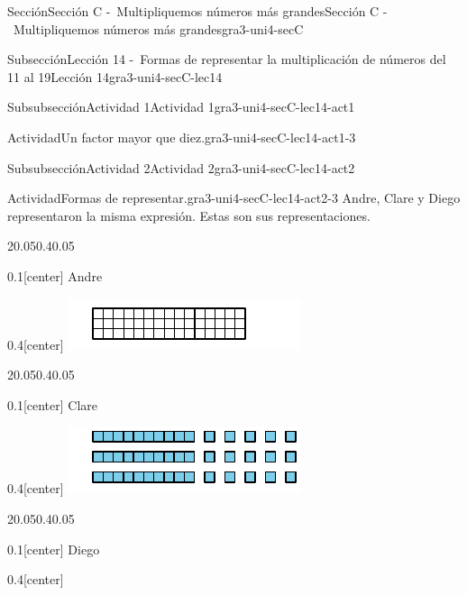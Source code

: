 \documentclass[twoside,10pt,]{article}
\begin{document}
\begin{sectionptx}{Sección}{Sección C -~Multipliquemos números más grandes}{}{Sección C -~Multipliquemos números más grandes}{}{}{gra3-uni4-secC}
\begin{subsectionptx}{Subsección}{Lección 14 -~Formas de representar la multiplicación de números del 11 al 19}{}{Lección 14}{}{}{gra3-uni4-secC-lec14}
\begin{subsubsectionptx}{Subsubsección}{Actividad 1}{}{Actividad 1}{}{}{gra3-uni4-secC-lec14-act1}
\begin{activity}{Actividad}{Un factor mayor que diez.}{gra3-uni4-secC-lec14-act1-3}
\begin{enumerate}
\end{enumerate}
\end{activity}%
\end{subsubsectionptx}
%
%
\typeout{************************************************}
\typeout{************************************************}
%
\begin{subsubsectionptx}{Subsubsección}{Actividad 2}{}{Actividad 2}{}{}{gra3-uni4-secC-lec14-act2}
\begin{activity}{Actividad}{Formas de representar.}{gra3-uni4-secC-lec14-act2-3}%
Andre, Clare y Diego representaron la misma expresión. Estas son sus representaciones.%
\begin{sidebyside}{2}{0.05}{0.4}{0.05}%
\begin{sbspanel}{0.1}[center]%
Andre%
\end{sbspanel}%
\begin{sbspanel}{0.4}[center]%
\includegraphics[width=\linewidth]{external/svg-source/tikz-file-147551.pdf}
\end{sbspanel}%
\end{sidebyside}%
\begin{sidebyside}{2}{0.05}{0.4}{0.05}%
\begin{sbspanel}{0.1}[center]%
Clare%
\end{sbspanel}%
\begin{sbspanel}{0.4}[center]%
\includegraphics[width=\linewidth]{external/svg-source/tikz-file-147552.pdf}
\end{sbspanel}%
\end{sidebyside}%
\begin{sidebyside}{2}{0.05}{0.4}{0.05}%
\begin{sbspanel}{0.1}[center]%
Diego%
\end{sbspanel}%
\begin{sbspanel}{0.4}[center]%

\end{sbspanel}
\end{sidebyside}
\end{activity}
\end{subsubsectionptx}
\end{subsectionptx}
\end{sectionptx}
\end{document}
